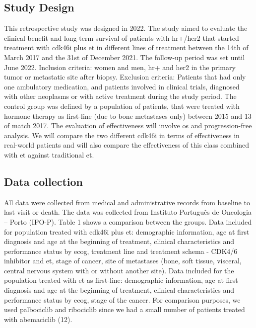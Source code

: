 

\subsection{Study Design}

This retrospective study was designed in 2022. The study aimed to evaluate the clinical benefit and long-term survival of patients with \ac{hr+}/\ac{her2} that started treatment with \ac{cdk46i} plus \ac{et} in different lines of treatment between the 14th of March 2017 and the 31st of December 2021. The follow-up period was set until June 2022. Inclusion criteria: women and men, \ac{hr+} and \ac{her2} in the primary tumor or metastatic site after biopsy. Exclusion criteria: Patients that had only one ambulatory medication, and patients involved in clinical trials, diagnosed with other neoplasms or with active treatment during the study period. The control group was defined by a population of patients, that were treated with hormone therapy as first-line (due to bone metastases only) between 2015 and 13 of match 2017.
The evaluation of effectiveness will involve \ac{os} and progression-free analysis. We will compare the two different \ac{cdk46i} in terms of effectiveness in real-world patients and will also compare the effectiveness of this class combined with \ac{et} against traditional \ac{et}.


\subsection{Data collection}
All data were collected from medical and administrative records from baseline to last visit or death. The data was collected from Instituto Português de Oncologia – Porto (IPO-P). Table 1 shows a comparison between the groups.
Data included for population treated with \ac{cdk46i} plus \ac{et}: demographic information, age at first diagnosis and age at the beginning of treatment, clinical characteristics and performance status by  \ac{ecog}, treatment line and treatment schema - CDK4/6 inhibitor and \ac{et}, stage of cancer, site of metastases (bone, soft tissue, visceral, central nervous system with or without another site).
Data included for the population treated with \ac{et} as first-line: demographic information, age at first diagnosis and age at the beginning of treatment, clinical characteristics and performance status by  \ac{ecog}, stage of the cancer.
For comparison purposes, we used palbociclib and ribociclib since we had a small number of patients treated with abemaciclib (12).

